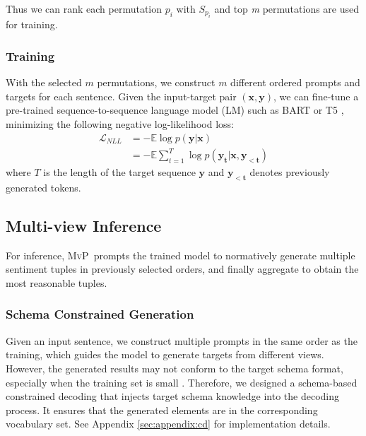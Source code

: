 \documentclass[11pt]{article}
\newcommand\mvp{\textsc{MvP}}
\begin{document}
Thus we can rank each permutation $p_i$ with $S_{p_i}$ and top \emph{m} permutations are used for training. 


\subsubsection{Training}
\label{subsubsec:method:training}
With the selected $m$ permutations, we construct $m$ different ordered prompts and targets for each sentence. Given the input-target pair $(\boldsymbol{x}, \boldsymbol{y})$, we can fine-tune a pre-trained sequence-to-sequence language model (LM) such as BART \cite{lewis-etal-2020-bart} or T5 \cite{DBLP:journals/jmlr/RaffelSRLNMZLL20}, minimizing the following negative log-likelihood loss:
\begin{equation}\label{nll-loss}
\begin{aligned}
\mathcal{L}_{NLL} &= -\mathbb{E} \log p(\boldsymbol{y} | \boldsymbol{x}) \\ 
 &= -\mathbb{E}\sum_{t=1}^{T}\log p(\boldsymbol{y_t} | \boldsymbol{x}, \boldsymbol{y_{<t}})
\end{aligned}
\end{equation}
where $T$ is the length of the target sequence $\boldsymbol{y}$ and $\boldsymbol{y_{<t}}$ denotes previously generated tokens.





\subsection{Multi-view Inference}
\label{subsec:method:mvp}

For inference, \mvp~prompts the trained model to normatively generate multiple sentiment tuples in previously selected orders, and finally aggregate to obtain the most reasonable tuples. 

\subsubsection{Schema Constrained Generation} 
\label{subsubsec:method:constrained-decoding}
Given an input sentence, we construct multiple prompts in the same order as the training, which guides the model to generate targets from different views. 
However, the generated results may not conform to the target schema format, especially when the training set is small \cite{zhang-etal-2021-aspect, yan-etal-2021-unified}. Therefore, we designed a schema-based constrained decoding \cite{DBLP:conf/iclr/CaoI0P21} that injects target schema knowledge into the decoding process. It ensures that the generated elements are in the corresponding vocabulary set. See Appendix \ref{sec:appendix:cd} for implementation details.
\end{document}
